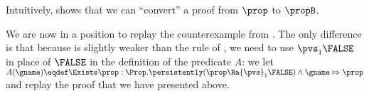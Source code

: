 Intuitively,  shows that we can ``convert'' a proof from $\prop$ to $\propB$.

We are now in a position to replay the counterexample from .
The only difference is that because  is slightly weaker than the rule  of , we need to use ${\pvs}_1 \FALSE$ in place of $\FALSE$ in the definition of the predicate $A$:
we let \(
  A(\gname) \eqdef \Exists \prop : \Prop. \persistently (\prop \Ra {\pvs}_1 \FALSE) \land \gname \Mapsto \prop\)
and replay the proof that we have presented above.


